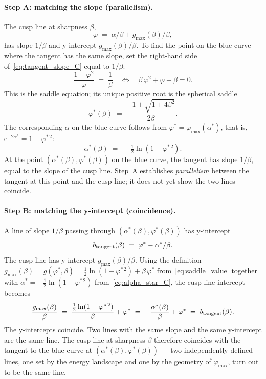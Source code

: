 \documentclass[letterpaper]{article} %
\newcommand{\e}{{\mathrm{e}}}
\newcommand{\Bnet}{\beta}
\begin{document}
\paragraph{Step A: matching the slope (parallelism).}
The cusp line at sharpness $\Bnet$,
\begin{equation}
\varphi \;=\; \alpha/\Bnet + g_{\max}(\Bnet)/\Bnet,
\end{equation}
has slope $1/\Bnet$ and y-intercept $g_{\max}(\Bnet)/\Bnet$. To find the point on
the blue curve where the tangent has the same slope, set the right-hand side
of~\eqref{eq:tangent_slope_C} equal to $1/\Bnet$:
\begin{equation}
\frac{1-\varphi^2}{\varphi} \;=\; \frac{1}{\Bnet}
\quad\Longleftrightarrow\quad
\Bnet\,\varphi^2 + \varphi - \Bnet = 0.
\label{eq:saddle_eq_C}
\end{equation}
This is the saddle equation; its unique positive root is the spherical saddle
\begin{equation}
\varphi^*(\Bnet) \;=\; \frac{-1 + \sqrt{1+4\Bnet^2}}{2\Bnet}.
\end{equation}
The corresponding $\alpha$ on the blue curve follows from
$\varphi^* = \varphi_{\max}(\alpha^*)$, that is, $\e^{-2\alpha^*} = 1 - \varphi^{*\,2}$:
\begin{equation}
\alpha^*(\Bnet) \;=\; -\tfrac12 \ln(1-\varphi^{*\,2}).
\label{eq:alpha_star_C}
\end{equation}
At the point $(\alpha^*(\Bnet), \varphi^*(\Bnet))$ on the blue curve, the tangent
has slope $1/\Bnet$, equal to the slope of the cusp line. Step~A establishes
\textit{parallelism} between the tangent at this point and the cusp line; it does
not yet show the two lines coincide.

\paragraph{Step B: matching the y-intercept (coincidence).}
A line of slope $1/\Bnet$ passing through $(\alpha^*(\Bnet), \varphi^*(\Bnet))$ has
y-intercept
\begin{equation}
b_{\rm tangent}(\Bnet) \;=\; \varphi^* - \alpha^*/\Bnet.
\end{equation}
The cusp line has y-intercept $g_{\max}(\Bnet)/\Bnet$. Using the definition
$g_{\max}(\Bnet) = g(\varphi^*, \Bnet) = \tfrac12 \ln(1-\varphi^{*\,2}) + \Bnet\,\varphi^*$
from~\eqref{eq:saddle_value} together with $\alpha^* = -\tfrac12 \ln(1-\varphi^{*\,2})$
from~\eqref{eq:alpha_star_C}, the cusp-line intercept becomes
\begin{equation}
\frac{g_{\max}(\Bnet)}{\Bnet}
\;=\; \frac{\tfrac12 \ln(1-\varphi^{*\,2})}{\Bnet} + \varphi^*
\;=\; -\frac{\alpha^*(\Bnet)}{\Bnet} + \varphi^*
\;=\; b_{\rm tangent}(\Bnet).
\label{eq:intercept_match_C}
\end{equation}
The y-intercepts coincide. Two lines with the same slope and the same y-intercept
are the same line. The cusp line at sharpness $\Bnet$ therefore coincides with
the tangent to the blue curve at $(\alpha^*(\Bnet), \varphi^*(\Bnet))$ — two
independently defined lines, one set by the energy landscape and one by the
geometry of $\varphi_{\max}$, turn out to be the same line.
\end{document}
